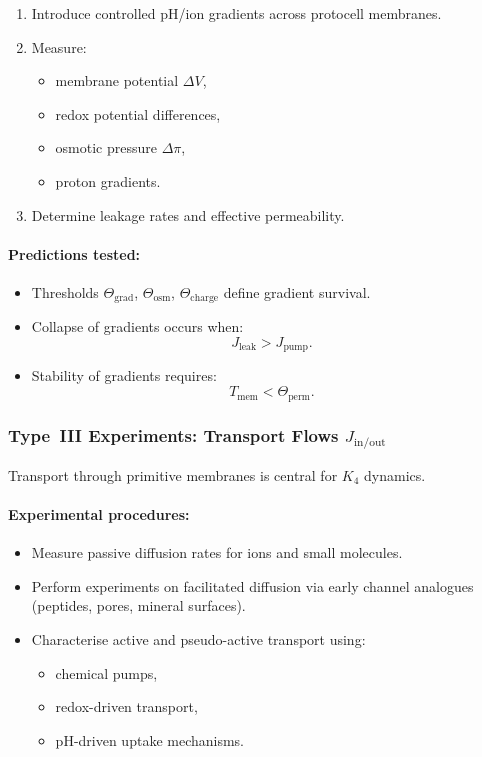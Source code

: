 \begin{enumerate}
    \item Introduce controlled pH/ion gradients across protocell membranes.
    \item Measure:
          \begin{itemize}
              \item membrane potential $\Delta V$,
              \item redox potential differences,
              \item osmotic pressure $\Delta\pi$,
              \item proton gradients.
          \end{itemize}
    \item Determine leakage rates and effective permeability.
\end{enumerate}

\paragraph{Predictions tested:}

\begin{itemize}
    \item Thresholds $\Theta_{\mathrm{grad}}$, $\Theta_{\mathrm{osm}}$,
          $\Theta_{\mathrm{charge}}$ define gradient survival.
    \item Collapse of gradients occurs when:
          \[
             J_{\mathrm{leak}} > J_{\mathrm{pump}}.
          \]
    \item Stability of gradients requires:
          \[
             T_{\mathrm{mem}} < \Theta_{\mathrm{perm}}.
          \]
\end{itemize}



\subsubsection{Type~III Experiments: Transport Flows $J_{\mathrm{in/out}}$}

Transport through primitive membranes is central for $K_4$ dynamics.

\paragraph{Experimental procedures:}

\begin{itemize}
    \item Measure passive diffusion rates for ions and small molecules.
    \item Perform experiments on facilitated diffusion via early channel
          analogues (peptides, pores, mineral surfaces).
    \item Characterise active and pseudo-active transport using:
          \begin{itemize}
              \item chemical pumps,
              \item redox-driven transport,
              \item pH-driven uptake mechanisms.
          \end{itemize}
\end{itemize}


